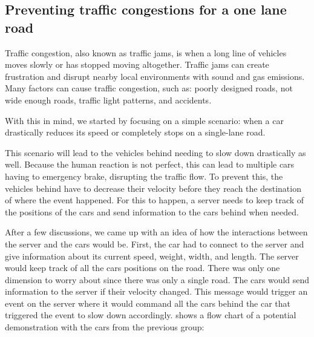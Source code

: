 \subsection{Preventing traffic congestions for a one lane road}

Traffic congestion, also known as traffic jams, is when a long line of vehicles moves slowly or has stopped moving altogether. Traffic jams can create frustration and disrupt nearby local environments with sound and gas emissions. Many factors can cause traffic congestion, such as:
poorly designed roads, not wide enough roads, traffic light patterns, and accidents.

With this in mind, we started by focusing on a simple scenario: when a car drastically reduces its speed or completely stops on a single-lane road. 

This scenario will lead to the vehicles behind needing to slow down drastically as well. Because the human reaction is not perfect, this can lead to multiple cars having to emergency brake, disrupting the traffic flow. To prevent this, the vehicles behind have to decrease their velocity before they reach the destination of where the event happened. For this to happen, a server needs to keep track of the positions of the cars and send information to the cars behind when needed. 

After a few discussions, we came up with an idea of how the interactions between the server and the cars would be. First, the car had to connect to the server and give information about its current speed, weight, width, and length. The server would keep track of all the cars positions on the road. There was only one dimension to worry about since there was only a single road. The cars would send information to the server if their velocity changed. This message would trigger an event on the server where it would command all the cars behind the car that triggered the event to slow down accordingly. shows a flow chart of a potential demonstration with the cars from the previous group:

